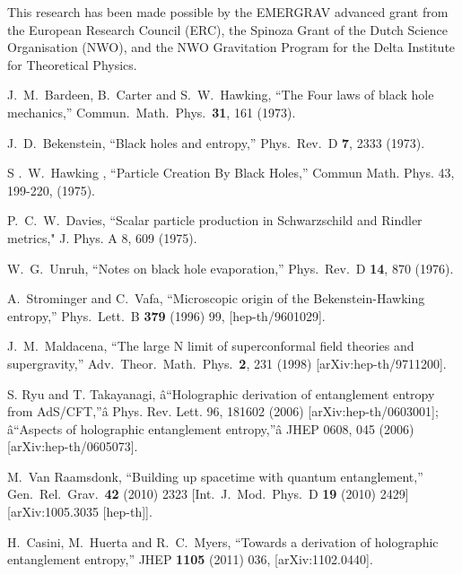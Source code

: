 \documentclass[a4paper,12pt]{article}
\begin{document}
This research has been made possible by the EMERGRAV advanced grant from the European 
Research Council (ERC), the Spinoza Grant of the Dutch Science Organisation (NWO), 
and the  NWO Gravitation Program  for the Delta Institute for Theoretical Physics.
\vspace{4cm}

\newpage



\begin{thebibliography}{100}





 J.~M.~Bardeen, B.~Carter and S.~W.~Hawking,
``The Four laws of black hole mechanics,''
 Commun.\ Math.\ Phys.\  {\bf 31}, 161 (1973).

 J.~D.~Bekenstein,
 ``Black holes and entropy,''
 Phys.\ Rev.\  D {\bf 7}, 2333 (1973).

S .~W.~Hawking , ``Particle Creation By Black Holes,''  Commun Math. Phys. 43, 199-220, (1975).

P.~C.~W.~Davies, ``Scalar particle production in Schwarzschild and Rindler metrics," J. Phys. A 8, 609 (1975).

 W.~G.~Unruh,
``Notes on black hole evaporation,''
 Phys.\ Rev.\  D {\bf 14}, 870 (1976).

  A.~Strominger and C.~Vafa,
  ``Microscopic origin of the Bekenstein-Hawking entropy,''
  Phys.\ Lett.\ B {\bf 379} (1996) 99,
  [hep-th/9601029].
  
J.~M.~Maldacena,
 ``The large N limit of superconformal field theories and supergravity,''
Adv.\ Theor.\ Math.\ Phys.\  {\bf 2}, 231 (1998)
 [arXiv:hep-th/9711200].


 S. Ryu and T. Takayanagi, â``Holographic derivation of entanglement entropy from AdS/CFT,''â Phys. Rev. Lett. 96, 181602 (2006) [arXiv:hep-th/0603001]; %
â``Aspects of holographic entanglement entropy,''â JHEP 0608, 045 (2006) [arXiv:hep-th/0605073].

  M.~Van Raamsdonk,
  ``Building up spacetime with quantum entanglement,''
  Gen.\ Rel.\ Grav.\  {\bf 42} (2010) 2323
   [Int.\ J.\ Mod.\ Phys.\ D {\bf 19} (2010) 2429]
  [arXiv:1005.3035 [hep-th]].

  H.~Casini, M.~Huerta and R.~C.~Myers,
  ``Towards a derivation of holographic entanglement entropy,''
  JHEP {\bf 1105} (2011) 036,
  [arXiv:1102.0440].


\end{thebibliography}
\end{document}

